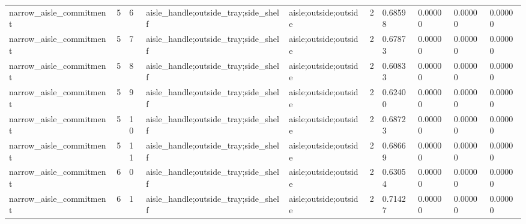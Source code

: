 \documentclass{article}
\begin{document}
\begin{table}[tbp]
{\begin{tabular}{llllllllll}
narrow\_aisle\_commitment & 5 & 6 & aisle\_handle;outside\_tray;side\_shelf & aisle;outside;outside & 2 & 0.68598 & 0.00000 & 0.00000 & 0.00000 \\
narrow\_aisle\_commitment & 5 & 7 & aisle\_handle;outside\_tray;side\_shelf & aisle;outside;outside & 2 & 0.67873 & 0.00000 & 0.00000 & 0.00000 \\
narrow\_aisle\_commitment & 5 & 8 & aisle\_handle;outside\_tray;side\_shelf & aisle;outside;outside & 2 & 0.60833 & 0.00000 & 0.00000 & 0.00000 \\
narrow\_aisle\_commitment & 5 & 9 & aisle\_handle;outside\_tray;side\_shelf & aisle;outside;outside & 2 & 0.62400 & 0.00000 & 0.00000 & 0.00000 \\
narrow\_aisle\_commitment & 5 & 10 & aisle\_handle;outside\_tray;side\_shelf & aisle;outside;outside & 2 & 0.68723 & 0.00000 & 0.00000 & 0.00000 \\
narrow\_aisle\_commitment & 5 & 11 & aisle\_handle;outside\_tray;side\_shelf & aisle;outside;outside & 2 & 0.68669 & 0.00000 & 0.00000 & 0.00000 \\
narrow\_aisle\_commitment & 6 & 0 & aisle\_handle;outside\_tray;side\_shelf & aisle;outside;outside & 2 & 0.63054 & 0.00000 & 0.00000 & 0.00000 \\
narrow\_aisle\_commitment & 6 & 1 & aisle\_handle;outside\_tray;side\_shelf & aisle;outside;outside & 2 & 0.71427 & 0.00000 & 0.00000 & 0.00000 \\
\bottomrule
\end{tabular}
}
\end{table}

\clearpage
\end{document}
